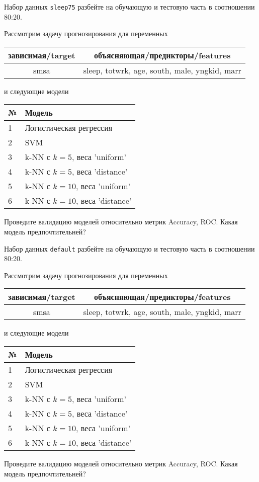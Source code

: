 \begin{exercise}
Набор данных \texttt{sleep75} разбейте на обучающую и тестовую часть
в соотношении 80:20.

Рассмотрим задачу прогнозирования для переменных
\begin{center}
	\begin{tabular}{|c|c|}\hline
		зависимая/target & объясняющая/предикторы/features \\ \hline
		smsa & sleep, totwrk, age, south, male, yngkid, marr \\ \hline
	\end{tabular}
\end{center}
и следующие модели
\begin{center}
	\begin{tabular}{|l|l|}\hline
		№ & Модель \\ \hline
		1 & Логистическая регрессия\\
		2 & SVM \\ 
		3 & k-NN с \(k=5\), веса 'uniform' \\
		4 & k-NN с \(k=5\), веса 'distance' \\
		5 & k-NN с \(k=10\), веса 'uniform' \\
		6 & k-NN с \(k=10\), веса 'distance' \\ \hline
	\end{tabular}
\end{center}
Проведите валидацию моделей относительно метрик Accuracy, ROC. Какая модель предпочтительней?
\end{exercise}

\begin{exercise}
Набор данных \texttt{default} разбейте на обучающую и тестовую часть
в соотношении 80:20.
	
Рассмотрим задачу прогнозирования для переменных
\begin{center}
	\begin{tabular}{|c|c|}\hline
		зависимая/target & объясняющая/предикторы/features \\ \hline
		smsa & sleep, totwrk, age, south, male, yngkid, marr \\ \hline
	\end{tabular}
\end{center}
и следующие модели
\begin{center}
	\begin{tabular}{|l|l|}\hline
		№ & Модель \\ \hline
		1 & Логистическая регрессия\\
		2 & SVM \\ 
		3 & k-NN с \(k=5\), веса 'uniform' \\
		4 & k-NN с \(k=5\), веса 'distance' \\
		5 & k-NN с \(k=10\), веса 'uniform' \\
		6 & k-NN с \(k=10\), веса 'distance' \\ \hline
	\end{tabular}
\end{center}
Проведите валидацию моделей относительно метрик Accuracy, ROC. Какая модель предпочтительней?
\end{exercise}